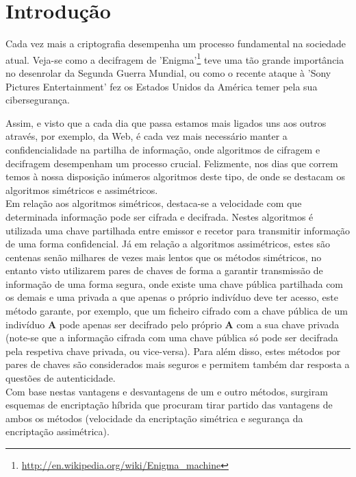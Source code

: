 \documentclass[a4paper,11pt,openright,oneside]{report}
\begin{document}
\tableofcontents
\listoffigures

\clearpage
{}

\chapter{Introdução}
\label{chap.introdução}

Cada vez mais a criptografia desempenha um processo fundamental na sociedade atual. Veja-se como a decifragem de 'Enigma'\footnote{\url{http://en.wikipedia.org/wiki/Enigma_machine}} teve uma tão grande importância no desenrolar da Segunda Guerra Mundial, ou como o recente ataque à 'Sony Pictures Entertainment' fez os Estados Unidos da América temer pela sua cibersegurança.

Assim, e visto que a cada dia que passa estamos mais ligados uns aos outros através, por exemplo, da Web, é cada vez mais necessário manter a confidencialidade na partilha de informação, onde algoritmos de cifragem e decifragem desempenham um processo crucial. Felizmente, nos dias que correm temos à nossa disposição inúmeros algoritmos deste tipo, de onde se destacam os algoritmos simétricos e assimétricos.\\

Em relação aos algoritmos simétricos, destaca-se a velocidade com que determinada informação pode ser cifrada e decifrada. Nestes algoritmos é utilizada uma chave partilhada entre emissor e recetor para transmitir informação de uma forma confidencial. Já em relação a algoritmos assimétricos, estes são centenas senão milhares de vezes mais lentos que os métodos simétricos, no entanto visto utilizarem pares de chaves de forma a garantir transmissão de informação de uma forma segura, onde existe uma chave pública partilhada com os demais e uma privada a que apenas o próprio indivíduo deve ter acesso, este método garante, por exemplo, que um ficheiro cifrado com a chave pública de um indivíduo \textbf{A} pode apenas ser decifrado pelo próprio \textbf{A} com a sua chave privada (note-se que a informação cifrada com uma chave pública só pode ser decifrada pela respetiva chave privada, ou vice-versa). Para além disso, estes métodos por pares de chaves são considerados mais seguros e permitem também dar resposta a questões de autenticidade.\\

Com base nestas vantagens e desvantagens de um e outro métodos, surgiram esquemas de encriptação híbrida que procuram tirar partido das vantagens de ambos os métodos (velocidade da encriptação simétrica e segurança da encriptação assimétrica).
\end{document}
